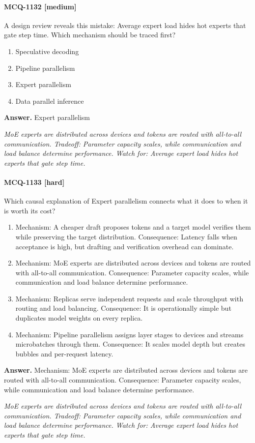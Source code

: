 \paragraph{MCQ-1132 [medium]} A design review reveals this mistake: Average expert load hides hot experts that gate step time. Which mechanism should be traced first?
\begin{enumerate}[label=\Alph*.]
\item Speculative decoding
\item Pipeline parallelism
\item Expert parallelism
\item Data parallel inference
\end{enumerate}
\noindent\textbf{Answer.} Expert parallelism
\par\textit{MoE experts are distributed across devices and tokens are routed with all-to-all communication. Tradeoff: Parameter capacity scales, while communication and load balance determine performance. Watch for: Average expert load hides hot experts that gate step time.}
\paragraph{MCQ-1133 [hard]} Which causal explanation of Expert parallelism connects what it does to when it is worth its cost?
\begin{enumerate}[label=\Alph*.]
\item Mechanism: A cheaper draft proposes tokens and a target model verifies them while preserving the target distribution. Consequence: Latency falls when acceptance is high, but drafting and verification overhead can dominate.
\item Mechanism: MoE experts are distributed across devices and tokens are routed with all-to-all communication. Consequence: Parameter capacity scales, while communication and load balance determine performance.
\item Mechanism: Replicas serve independent requests and scale throughput with routing and load balancing. Consequence: It is operationally simple but duplicates model weights on every replica.
\item Mechanism: Pipeline parallelism assigns layer stages to devices and streams microbatches through them. Consequence: It scales model depth but creates bubbles and per-request latency.
\end{enumerate}
\noindent\textbf{Answer.} Mechanism: MoE experts are distributed across devices and tokens are routed with all-to-all communication. Consequence: Parameter capacity scales, while communication and load balance determine performance.
\par\textit{MoE experts are distributed across devices and tokens are routed with all-to-all communication. Tradeoff: Parameter capacity scales, while communication and load balance determine performance. Watch for: Average expert load hides hot experts that gate step time.}
